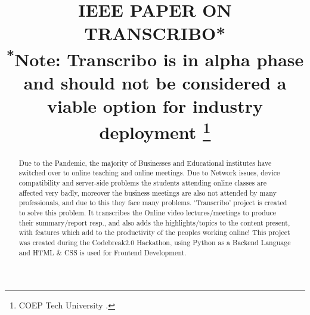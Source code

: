\documentclass[conference]{IEEEtran}
\begin{document}
\title{IEEE PAPER ON TRANSCRIBO*\\
{\footnotesize \textsuperscript{*}Note: Transcribo is in alpha phase and should not be considered a viable option for industry deployment}
\thanks{COEP Tech University .}
}

\author{
\and
{}

 }

\maketitle

\begin{abstract}
Due to the Pandemic, the majority of Businesses and Educational institutes have switched over to online teaching and online meetings. Due to Network issues, device compatibility and server-side problems the students attending online classes are affected very badly, moreover the business meetings are also not attended by many professionals, and due to this they face many problems.
‘Transcribo’ project is created to solve this problem. It transcribes the Online video lectures/meetings to produce their summary/report resp., and also adds the highlights/topics to the content present, with features which add to the productivity of the peoples working online!
This project was created during the Codebreak2.0 Hackathon, using Python as a Backend Language and HTML \& CSS is used for Frontend Development. 

\end{abstract}
\end{document}
